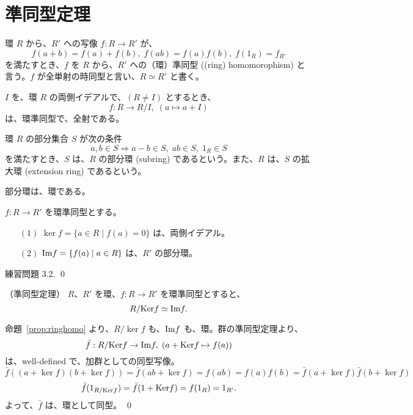 \newpage
\section{準同型定理}
\begin{definition}
環 $R$ から、$R'$ への写像 $f : R\rightarrow R'$ が、
$$f(a + b) = f(a) + f(b), \; f(ab) = f(a)f(b), \; f(1_R) = f_{R'}$$
を満たすとき、$f$ を $R$ から、$R'$ への（環）準同型 ((ring) homomorophism) と言う。$f$ が全単射の時同型と言い、$R\simeq R'$ と書く。
\end{definition}

\begin{eg}
$I$  を、環 $R$ の両側イデアルで、$(R\neq I)$ とするとき、
$$f : R \longrightarrow R/I, \; (a\mapsto a + I)$$
は、環準同型で、全射である。
\end{eg}

\begin{definition}
環 $R$ の部分集合 $S$ が次の条件
$$a, b\in S \Rightarrow a - b\in S, \; ab\in S, \; 1_R\in S$$
を満たすとき、$S$ は、$R$ の部分環 (subring) であるという。また、$R$ は、$S$ の拡大環 (extension ring) であるという。
\end{definition}

\begin{ex}
部分環は、環である。
\end{ex}

\begin{prop} \label{prop:ringhomo}
$f : R \rightarrow R'$ を環準同型とする。
\begin{itemize}
\item[$(1)$] $\ker f = \{a\in R\mid f(a) = 0\}$ は、両側イデアル。
\item[$(2)$] $\mbox{{\rm Im}} f = \{f(a) \mid a\in R\}$ は、$R'$ の部分環。
\end{itemize}
\end{prop}
\proof
練習問題 3.2.
\qed

\begin{thm} （準同型定理）
$R$、$R'$ を環、$f: R \rightarrow R'$ を環準同型とすると、
$$R/\mbox{{\rm Ker}} f \simeq \mbox{{\rm Im}} f.$$
\end{thm}
\proof
命題~\ref{prop:ringhomo} より、$R/\ker f$ も、$\mbox{{\rm Im}} f$ も、環。群の準同型定理より、
$$\bar{f} : R/\mbox{{\rm Ker}} f \rightarrow \mbox{{\rm Im}} f,\; (a + \mbox{{\rm Ker}} f \mapsto f(a))$$
は、well-defined で、加群としての同型写像。
$$\bar{f}((a+\ker f)(b+\ker f)) = \bar{f}(ab + \ker f) = f(ab) = f(a)f(b) = \bar{f}(a+\ker f)\bar{f}(b+\ker f)$$
$$\bar{f}(1_{R/{\mbox{{\scriptsize\rm Ker}}} f}) = \bar{f}(1+\mbox{{\rm Ker}} f) = f(1_R) = 1_{R'}.$$
よって、$\bar{f}$ は、環として同型。
\qed

